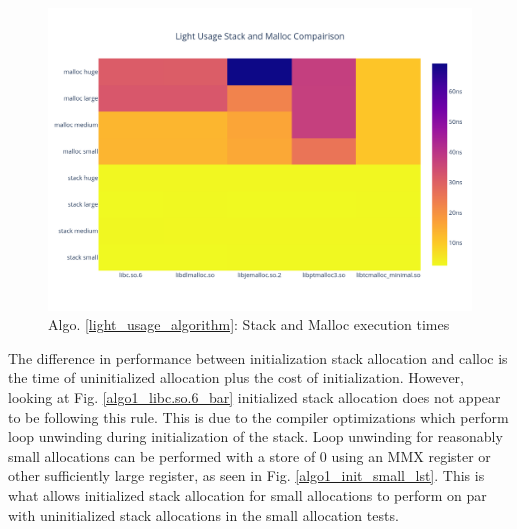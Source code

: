 \documentclass[letterpaper, 10 pt, conference]{ieeeconf}  %
\begin{document}
\begin{figure}[tbh!]
  \centering
  \includegraphics[width=\columnwidth]{graphs/light_stack_malloc_hist.png}
  \caption{ Algo. \ref{light_usage_algorithm}: Stack and Malloc execution times } 
  \label{algo1_stack_malloc_hist}
\end{figure}

The difference in performance between initialization stack allocation and calloc is the time of uninitialized allocation plus the cost of initialization.
However, looking at Fig. \ref{algo1_libc.so.6_bar} initialized stack allocation does not appear to be following this rule.
This is due to the compiler optimizations which perform loop unwinding during initialization of the stack.
Loop unwinding for reasonably small allocations can be performed with a store of $0$ using an MMX register or other sufficiently large register, as seen in Fig. \ref{algo1_init_small_lst}.
This is what allows initialized stack allocation for small allocations to perform on par with uninitialized stack allocations in the small allocation tests.
\end{document}
